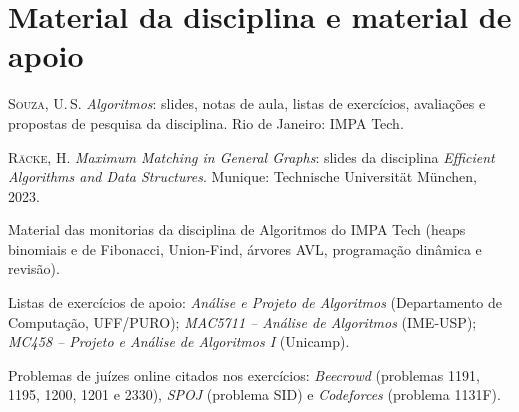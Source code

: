 \section*{Material da disciplina e material de apoio}
\begin{enumerate}[label={[\arabic*]},leftmargin=2.2em,resume]
  \item \textsc{Souza}, U.\,S. \emph{Algoritmos}: slides, notas de aula, listas de exercícios, avaliações e propostas de pesquisa da disciplina. Rio de Janeiro: IMPA Tech.
  \item \textsc{Räcke}, H. \emph{Maximum Matching in General Graphs}: slides da disciplina \emph{Efficient Algorithms and Data Structures}. Munique: Technische Universität München, 2023.
  \item Material das monitorias da disciplina de Algoritmos do IMPA Tech (heaps binomiais e de Fibonacci, Union-Find, árvores AVL, programação dinâmica e revisão).
  \item Listas de exercícios de apoio: \emph{Análise e Projeto de Algoritmos} (Departamento de Computação, UFF/PURO); \emph{MAC5711 -- Análise de Algoritmos} (IME-USP); \emph{MC458 -- Projeto e Análise de Algoritmos I} (Unicamp).
  \item Problemas de juízes online citados nos exercícios: \emph{Beecrowd} (problemas 1191, 1195, 1200, 1201 e 2330), \emph{SPOJ} (problema SID) e \emph{Codeforces} (problema 1131F).
\end{enumerate}
